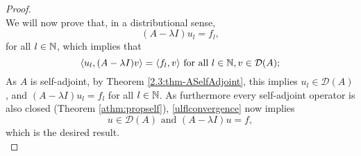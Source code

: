 \begin{theorem}
\begin{proof}
\begin{equation}
			\end{equation}
		We will now prove that, in a distributional sense, 
		\[ (A - \lambda I) u_{l} = f_{l}, \]
		for all $l \in \mathbb{N}$, which implies that
		\begin{equation}
				\langle u_{l}, (A - \lambda I) v \rangle = \langle f_{l}, v\rangle \text{ for all } l \in \mathbb{N}, v \in \mathcal{D}(A); \label{lefttoprove}
			\end{equation} 
		As $A$ is self-adjoint, by Theorem \ref{2.3:thm-ASelfAdjoint}, this implies $u_{l} \in \mathcal{D}(A)$, and $(A - \lambda I) u_{l} = f_{l}$ for all $l \in \mathbb{N}$. As furthermore every self-adjoint operator is also closed (Theorem \eqref{athm:propself}), \eqref{ulflconvergence} now implies
			\[ u \in \mathcal{D}(A) \text{ and } (A - \lambda I) u = f, \]
		which is the desired result. 
		~\\
				

\end{proof}
\end{theorem}
